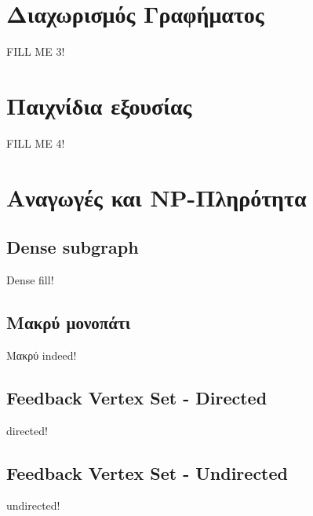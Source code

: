 \documentclass[a4paper,11pt]{article}
\begin{document}

\section{Διαχωρισμός Γραφήματος}
FILL ME 3!


\section{Παιχνίδια εξουσίας}
FILL ME 4!


\section{Αναγωγές και NP-Πληρότητα}
\subsection{Dense subgraph}
Dense fill!
\subsection{Μακρύ μονοπάτι}
Μακρύ indeed!
\subsection{Feedback Vertex Set - Directed}
directed!
\subsection{Feedback Vertex Set - Undirected}
undirected!

\end{document}
